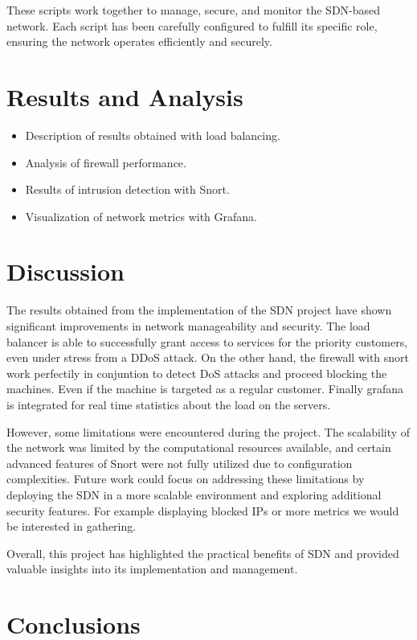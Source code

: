 \documentclass[a4paper,12pt]{article}
\begin{document}
These scripts work together to manage, secure, and monitor the SDN-based network. Each script has been carefully configured to fulfill its specific role, ensuring the network operates efficiently and securely.


\section{Results and Analysis}
\begin{itemize}
    \item Description of results obtained with load balancing.
    \item Analysis of firewall performance.
    \item Results of intrusion detection with Snort.
    \item Visualization of network metrics with Grafana.
\end{itemize}

\section{Discussion}
The results obtained from the implementation of the SDN project have shown significant improvements in network manageability and security. The load balancer is able to successfully grant access to services for the priority customers, even under stress from a DDoS attack.
On the other hand, the firewall with snort work perfectily in conjuntion to detect DoS attacks and proceed blocking the machines. Even if the machine is targeted as a regular customer.
Finally grafana is integrated for real time statistics about the load on the servers.

However, some limitations were encountered during the project. The scalability of the network was limited by the computational resources available, and certain advanced features of Snort were not fully utilized due to configuration complexities. Future work could focus on addressing these limitations by deploying the SDN in a more scalable environment and exploring additional security features. For example displaying blocked IPs or more metrics we would be interested in gathering.

Overall, this project has highlighted the practical benefits of SDN and provided valuable insights into its implementation and management.

\section{Conclusions}
\end{document}

